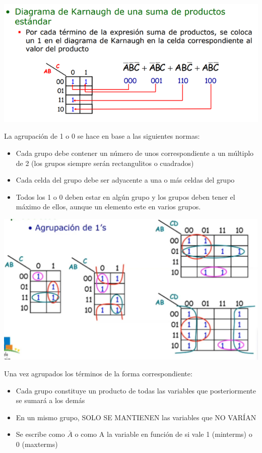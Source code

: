 \documentclass[a4paper,10pt]{book}
\begin{document}
\begin{center}
\includegraphics[scale=0.95]{mapas 4}
\end{center}

La agrupación de 1 o 0 se hace en base a las siguientes normas:
\begin{itemize}
\item Cada grupo debe contener un número de unos correspondiente a un múltiplo de 2 (los grupos siempre serán rectangulitos o cuadrados)
\item Cada celda del grupo debe ser adyacente a una o más celdas del grupo
\item Todos los 1 o 0 deben estar en algún grupo y los grupos deben tener el máximo de ellos, aunque un elemento este en varios grupos.
\end{itemize}

\begin{center}
\includegraphics[scale=0.95]{mapas 5}
\end{center}

Una vez agrupados los términos de la forma correspondiente:
\begin{itemize}
\item Cada grupo constituye un producto de todas las variables que posteriormente se sumará a los demás
\item En un mismo grupo, SOLO SE MANTIENEN las variables que NO VARÍAN
\item Se escribe como $\bar{A}$ o como A la variable en función de si vale 1 (minterms) o 0 (maxterms)
\end{itemize}
\end{document}
